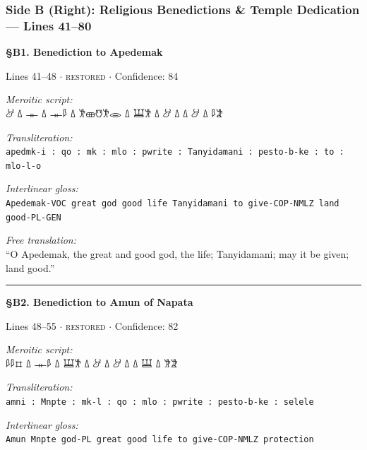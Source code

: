 \documentclass[11pt,a4paper]{article}
\begin{document}
{{{{{{{{\subsubsection*{Side B (Right): Religious Benedictions \& Temple Dedication --- Lines 41--80}


\vspace{6pt}
\noindent\textbf{\S B1. Benediction to Apedemak}
\hfill {\small Lines 41–48 $\cdot$ \textsc{restored} $\cdot$ Confidence: 84%

\vspace{3pt}
\noindent\textit{Meroitic script:}\\[2pt]
{\meroitic 𐦀𐦁 𐦗 𐦃 𐦗  𐦗 𐦃 𐦗 𐦂𐦓 𐦗 𐦑𐦂𐦒𐦈𐦂 𐦗 𐦁𐦔 𐦗 𐦔 𐦗 𐦃}

\vspace{4pt}
\noindent\textit{Transliteration:}\\[2pt]
\texttt{apedmk-i : qo : mk : mlo : pwrite : Tanyidamani : pesto-b-ke : to : mlo-l-o}

\vspace{4pt}
\noindent\textit{Interlinear gloss:}\\[2pt]
{\small\texttt{Apedemak-VOC  great  god  good  life  Tanyidamani  to give-COP-NMLZ  land  good-PL-GEN}}

\vspace{4pt}
\noindent\textit{Free translation:}\\[2pt]
``O Apedemak, the great and good god, the life; Tanyidamani; may it be given; land good.''

\vspace{2pt}
\noindent\rule{\textwidth}{0.3pt}


\vspace{6pt}
\noindent\textbf{\S B2. Benediction to Amun of Napata}
\hfill {\small Lines 48–55 $\cdot$ \textsc{restored} $\cdot$ Confidence: 82%

\vspace{3pt}
\noindent\textit{Meroitic script:}\\[2pt]
{\meroitic 𐦀𐦂 𐦗 𐦓 𐦗  𐦗 𐦃 𐦗 𐦃 𐦗 𐦂𐦓 𐦗 𐦁𐦔 𐦗 𐦕𐦁𐦁}

\vspace{4pt}
\noindent\textit{Transliteration:}\\[2pt]
\texttt{amni : Mnpte : mk-l : qo : mlo : pwrite : pesto-b-ke : selele}

\vspace{4pt}
\noindent\textit{Interlinear gloss:}\\[2pt]
{\small\texttt{Amun  Mnpte  god-PL  great  good  life  to give-COP-NMLZ  protection}}

}}}}}}}}}}
\end{document}

